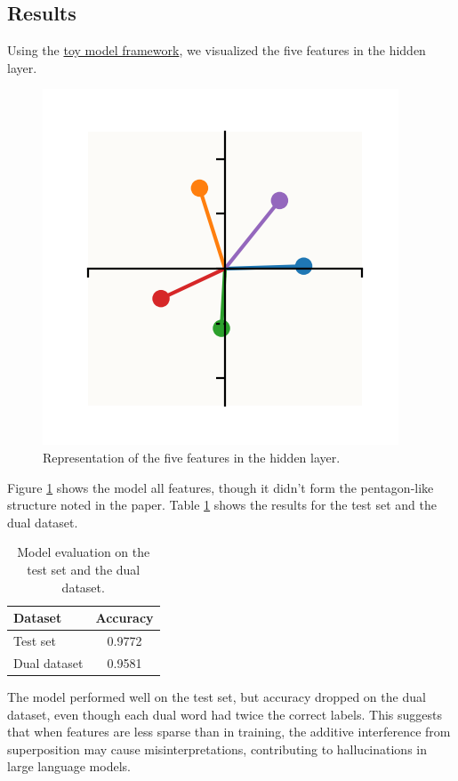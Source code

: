 \subsection{Results}
Using the \href{https://colab.research.google.com/github/anthropics/toy-models-of-superposition/blob/main/toy_models.ipynb}{toy model framework}, we visualized the five features in the hidden layer.
\begin{figure}[h]
	\centering
	\includegraphics[width=0.3\linewidth]{figures/hallucinations_hidden_layer.png}
	\caption{Representation of the five features in the hidden layer.}
	\label{fig:hidden_layer_representation}
\end{figure}
Figure \ref{fig:hidden_layer_representation} shows the model all features, though it didn't form the pentagon-like structure noted in the paper.
Table \ref{tab:hallucinations_results} shows the results for the test set and the dual dataset.
\begin{table}[h]
	\centering
	\begin{tabular}{lc}
		\toprule
		\textbf{Dataset} & \textbf{Accuracy} \\
		\midrule
		Test set         & 0.9772            \\
		Dual dataset     & 0.9581            \\
		\bottomrule
	\end{tabular}
	\caption{Model evaluation on the test set and the dual dataset.}
	\label{tab:hallucinations_results}
\end{table}
The model performed well on the test set, but accuracy dropped on the dual dataset, even though each dual word had twice the correct labels.
This suggests that when features are less sparse than in training, the additive interference from superposition may cause misinterpretations, contributing to hallucinations in large language models.

